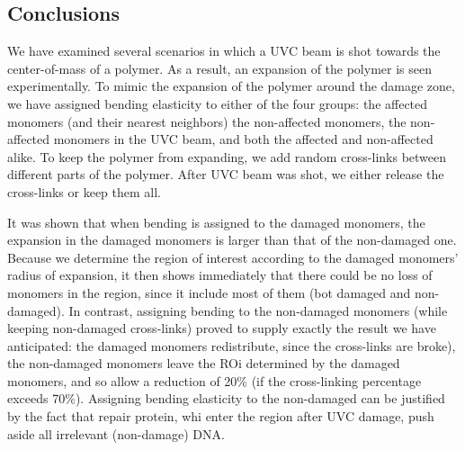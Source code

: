 \documentclass[12pt]{report}
\begin{document}
	 \subsection{Conclusions}
	 We have examined several scenarios in which a UVC beam is shot towards the center-of-mass of a polymer. As a result, an expansion of the polymer is seen experimentally. To mimic the expansion of the polymer around the damage zone, we have assigned bending elasticity to either of the four groups: the affected monomers (and their nearest neighbors) the non-affected monomers, the non-affected monomers in the UVC beam, and both the affected and non-affected alike. 
     To keep the polymer from expanding, we add random cross-links between different parts of the polymer. After UVC beam was shot, we either release the cross-links or keep them all.
     
     It was shown that when bending is assigned to the damaged monomers, the expansion in the damaged monomers is larger than that of the non-damaged one. Because we determine the region of interest according to the damaged monomers' radius of expansion, it then shows immediately that there could be no loss of monomers in the region, since it include most of them (bot damaged and non-damaged). In contrast, assigning bending to the non-damaged monomers (while keeping non-damaged cross-links) proved to supply exactly the result we have anticipated: the damaged monomers redistribute, since the cross-links are broke), the non-damaged monomers leave the ROi determined by the damaged monomers, and so allow a reduction of 20\% (if the cross-linking percentage exceeds 70\%). Assigning bending elasticity to the non-damaged can be justified by the fact that repair protein, whi enter the region after UVC damage, push aside all irrelevant (non-damage) DNA.
     
     
     
\end{document}
